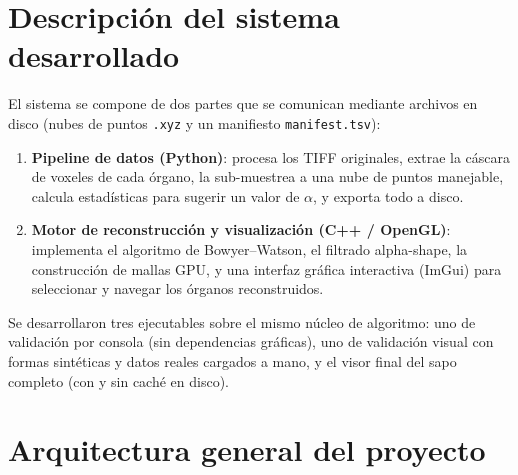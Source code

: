 \documentclass[12pt,a4paper]{article}
\begin{document}
\section{Descripción del sistema desarrollado}

El sistema se compone de dos partes que se comunican mediante archivos
en disco (nubes de puntos \texttt{.xyz} y un manifiesto
\texttt{manifest.tsv}):

\begin{enumerate}
    \item \textbf{Pipeline de datos (Python)}: procesa los TIFF
    originales, extrae la cáscara de voxeles de cada órgano, la
    sub-muestrea a una nube de puntos manejable, calcula estadísticas
    para sugerir un valor de $\alpha$, y exporta todo a disco.
    \item \textbf{Motor de reconstrucción y visualización (C++ /
    OpenGL)}: implementa el algoritmo de Bowyer--Watson, el filtrado
    alpha-shape, la construcción de mallas GPU, y una interfaz gráfica
    interactiva (ImGui) para seleccionar y navegar los órganos
    reconstruidos.
\end{enumerate}

Se desarrollaron tres ejecutables sobre el mismo núcleo de algoritmo:
uno de validación por consola (sin dependencias gráficas), uno de
validación visual con formas sintéticas y datos reales cargados a
mano, y el visor final del sapo completo (con y sin caché en disco).

\section{Arquitectura general del proyecto}
\end{document}
